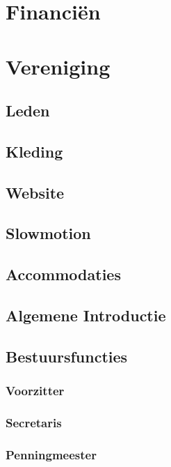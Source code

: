 \documentclass[]{article}
\begin{document}
\section{Financi\"en}


\section{Vereniging}
\subsection{Leden}

\subsection{Kleding}

\subsection{Website}

\subsection{Slowmotion}

\subsection{Accommodaties}

\subsection{Algemene Introductie}

\subsection{Bestuursfuncties}
\subsubsection{Voorzitter}

\subsubsection{Secretaris}

\subsubsection{Penningmeester}
\end{document}
